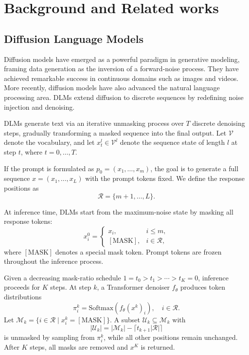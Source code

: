 \section{Background and Related works}

\subsection{Diffusion Language Models}
Diffusion models have emerged as a powerful paradigm in generative modeling,
framing data generation as the inversion of a forward-noise process. They have achieved
remarkable success in continuous domains such as images and videos. More
recently, diffusion models have also advanced the natural language processing area.
DLMs extend diffusion to discrete sequences by redefining noise injection and
denoising.

DLMs generate text via an iterative unmasking process
over $T$ discrete denoising steps, gradually transforming a masked sequence into
the final output. Let $\mathcal V$ denote the vocabulary, and let
$x_t^l \in \mathcal V^l$ denote the sequence state of length $l$ at step $t$,
where $t = 0, \ldots, T$.

If the prompt is formulated as $p_0 = (x_1, \ldots, x_m)$, the goal is to generate
a full sequence $x = (x_1, \ldots, x_L)$ with the prompt tokens fixed. We define
the response positions as
\[
\mathcal R = \{m+1, \ldots, L\}.
\]

At inference time, DLMs start from the maximum-noise state by masking all response
tokens:
\[
x_i^{0} =
\begin{cases}
x_i, & i \le m, \\
[\mathrm{MASK}], & i \in \mathcal R,
\end{cases}
\]
where $[\mathrm{MASK}]$ denotes a special mask token. Prompt tokens are frozen
throughout the inference process.

Given a decreasing mask-ratio schedule $1=t_0>t_1>\cdots>t_K=0$, inference proceeds
for $K$ steps. At step $k$, a Transformer denoiser $f_\theta$ produces token
distributions
\[
\pi_i^{k} = \mathrm{Softmax}(f_\theta(x^k)_i), \quad i \in \mathcal R.
\]
Let $\mathcal M_k = \{ i \in \mathcal R \mid x_i^{k} = [\mathrm{MASK}] \}$. A subset
$\mathcal U_k \subseteq \mathcal M_k$ with
\[
|\mathcal U_k| = |\mathcal M_k| - \lceil t_{k+1}|\mathcal R| \rceil
\]
is unmasked by sampling from $\pi_i^{k}$, while all other positions remain
unchanged. After $K$ steps, all masks are removed and $x^K$ is returned.


